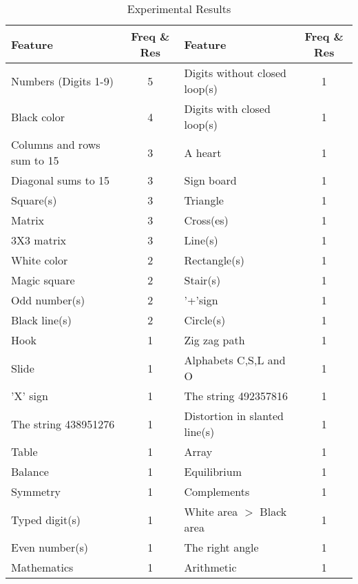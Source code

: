\documentclass{llncs}
\newcommand{\tick}{\ding{52}}
\newcommand{\cross}{\ding{56}}
\begin{document}
\begin{table}
\caption{Experimental Results}

\begin{center} 
\begin{tabular}{|l|c|l|c|}
\hline
Feature&Freq \& Res&Feature&Freq \& Res\\
\hline
Numbers (Digits 1-9)&5 \tick\tick\tick&Digits without closed loop(s)&1 \tick\tick\tick\\
Black color&4 \tick\tick\tick&Digits with closed loop(s)&1 \tick\tick\tick\\
Columns and rows sum to 15&3 \tick\tick\tick&A heart&1 \tick\cross\tick\\
Diagonal sums to 15&3 \tick\tick\tick&Sign board&1 \tick\cross\cross\\
Square(s)&3 \tick\tick\tick&Triangle&1 \tick\cross\tick\\
Matrix&3 \tick\tick\tick&Cross(es)&1 \tick\cross\tick\\
3X3 matrix&3 \tick\tick\tick&Line(s)&1 \tick\tick\tick\\
White color&2 \tick\tick\tick&Rectangle(s)&1 \tick\tick\cross\\
Magic square&2 \tick\tick\tick&Stair(s)&1 \tick\tick\tick\\
Odd number(s)&2 \tick\tick\tick&'+'sign&1 \tick\tick\tick\\
Black line(s)&2 \tick\tick\tick&Circle(s)&1 \tick\tick\tick\\
Hook&1 \tick\cross\tick&Zig zag path&1 \tick\cross\tick\\
Slide&1 \tick\cross\tick&Alphabets C,S,L and O&1 \tick\cross\tick\\
'X' sign&1 \tick\cross\cross&The string 492357816&1 \tick\tick\tick\\
The string 438951276&1 \tick\tick\tick&Distortion in slanted line(s)&1 \tick\cross\tick\\
Table&1 \tick\cross\tick&Array&1 \tick\tick\tick\\
Balance&1 \cross\cross\cross&Equilibrium&1 \tick\cross\cross\\
Symmetry&1 \tick\tick\tick&Complements&1 \tick\tick\cross\\
Typed digit(s)&1 \tick\tick\tick&White area $>$ Black area&1 \tick\tick\tick\\
Even number(s)&1 \tick\tick\tick&The right angle&1 \tick\tick\tick\\
Mathematics&1 \tick\tick\cross&Arithmetic&1 \tick\tick\cross\\
\hline
\end{tabular}
\end{center} 
\end{table}
\end{document}
